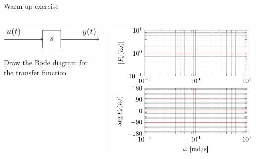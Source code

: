 \documentclass[presentation,aspectratio=1610]{beamer}
\begin{document}
\begin{frame}[label={sec:org07d6f70}]{Warm-up exercise}
\begin{columns}
\begin{column}{0.4\columnwidth}
\begin{center}
\includegraphics[width=\linewidth]{../../figures/block-simple-derivative}
\end{center}

\alert{Draw the Bode diagram for the transfer function}
\end{column}
\begin{column}{0.6\columnwidth}
\begin{center}
\includegraphics[width=\linewidth]{../../figures/bode-derivative-empty}
\end{center}
\end{column}
\end{columns}
\end{frame}
\end{document}
